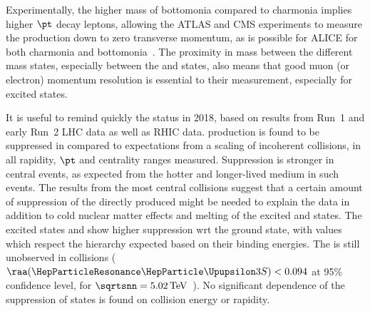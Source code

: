 \documentclass[../report.tex]{subfiles}
\begin{document}
Experimentally, the higher mass of bottomonia compared to charmonia implies higher $\pt$ decay leptons, allowing the ATLAS and CMS experiments to measure the production down to zero transverse momentum,
as is possible for ALICE for both charmonia and bottomonia~\cite{Abelev:2014nua,Acharya:2018mni}. The proximity in mass between the different mass states, especially between the  and  states, also 
means that good muon (or electron) momentum resolution is essential to their measurement, especially for excited states. 

It is useful to remind quickly the status in 2018, based on results from Run~1 and early Run~2 LHC data as well as RHIC data. \PGU production is found to be suppressed in \PbPb compared to expectations from a scaling of incoherent \pp collisions, in all rapidity, $\pt$ and centrality ranges measured. Suppression is stronger in central events, as expected from the hotter and longer-lived medium in such events.
The results from the most central collisions suggest that a certain amount of suppression of the directly produced  might be needed
  to explain the data in addition to cold nuclear matter effects and melting of the excited \PGU and \PGcb states.
The excited states  and  show higher suppression wrt the ground state, with \raa values which respect
  the hierarchy expected based on their binding energies. The  is still unobserved in \PbPb collisions ($\raa(\PGUP{3S})<0.094$ at 95\% confidence
level, for $\sqrtsnn = \unit[5.02]{TeV}$~\cite{Sirunyan:2017lzi,Sirunyan:2018nsz}). 
No significant dependence of the suppression of \PGU states is found on collision energy or rapidity.
\end{document}
